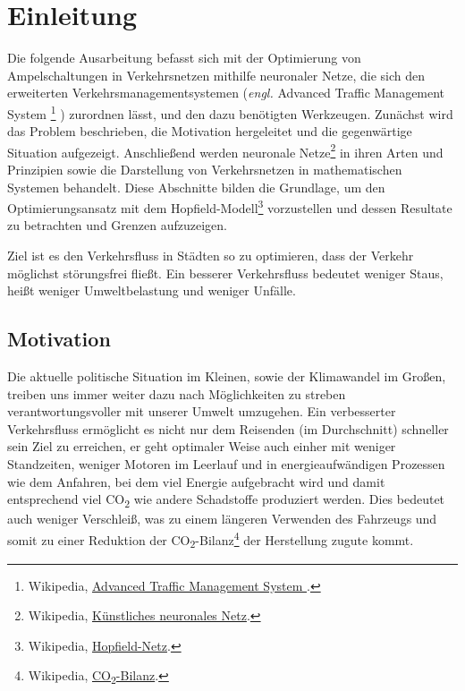\section{Einleitung}

Die folgende Ausarbeitung befasst sich mit der Optimierung von Ampelschaltungen in Verkehrsnetzen mithilfe neuronaler Netze, die sich den erweiterten Verkehrsmanagementsystemen (\textit{engl.} Advanced Traffic Management System
\footnote{
Wikipedia, \href{
https://en.wikipedia.org/wiki/Advanced\_Traffic\_Management\_System
}{
Advanced Traffic Management System
}.
}
)
zurordnen lässt, und den dazu benötigten Werkzeugen. Zunächst wird das Problem beschrieben, die Motivation hergeleitet und die gegenwärtige Situation aufgezeigt. Anschließend werden neuronale Netze\footnote{Wikipedia, \href{https://de.wikipedia.org/wiki/K\%C3\%BCnstliches\_neuronales\_Netz}{Künstliches neuronales Netz}.} in ihren Arten und Prinzipien sowie die Darstellung von Verkehrsnetzen in mathematischen Systemen behandelt. Diese Abschnitte bilden die Grundlage, um den Optimierungsansatz mit dem Hopfield-Modell\footnote{Wikipedia, \href{https://de.wikipedia.org/wiki/Hopfield-Netz}{Hopfield-Netz}.} vorzustellen und dessen Resultate zu betrachten und Grenzen aufzuzeigen.

Ziel ist es den Verkehrsfluss in Städten so zu optimieren, dass der Verkehr möglichst störungsfrei fließt. Ein besserer Verkehrsfluss bedeutet weniger Staus, heißt weniger Umweltbelastung und weniger Unfälle.

\subsection{Motivation}

Die aktuelle politische Situation im Kleinen, sowie der Klimawandel im Großen, treiben uns immer weiter dazu nach Möglichkeiten zu streben verantwortungsvoller mit unserer Umwelt umzugehen. Ein verbesserter Verkehrsfluss ermöglicht es nicht nur dem Reisenden (im Durchschnitt) schneller sein Ziel zu erreichen, er geht optimaler Weise auch einher mit weniger Standzeiten, weniger Motoren im Leerlauf und in energieaufwändigen Prozessen wie dem Anfahren, bei dem viel Energie aufgebracht wird und damit entsprechend viel CO\textsubscript{2} wie andere Schadstoffe produziert werden. Dies bedeutet auch weniger Verschleiß, was zu einem längeren Verwenden des Fahrzeugs und somit zu einer Reduktion der CO\textsubscript{2}-Bilanz\footnote{Wikipedia, \href{https://de.wikipedia.org/wiki/CO2-Bilanz}{CO\textsubscript{2}-Bilanz}.} der Herstellung zugute kommt.

